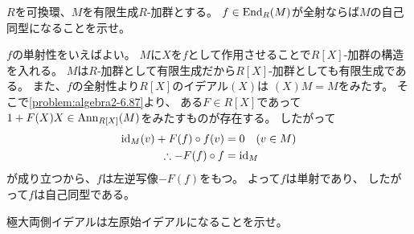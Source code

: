 \documentclass[report]{jlreq}
\begin{document}
\begin{problem}[代数学II 6.88]
    $R$を可換環、$M$を有限生成$R$-加群とする。
    $f \in \operatorname{End}_R(M)$が全射ならば$M$の自己同型になることを示せ。
\end{problem}

\begin{answer}
    $f$の単射性をいえばよい。
    $M$に$X$を$f$として作用させることで$R[X]$-加群の構造を入れる。
    $M$は$R$-加群として有限生成だから$R[X]$-加群としても有限生成である。
    また、$f$の全射性より$R[X]$のイデアル$(X)$は
    $(X)M = M$をみたす。
    そこで\cref{problem:algebra2-6.87}より、
    ある$F \in R[X]$であって$1 + F(X)X \in \operatorname{Ann}_{R[X]}(M)$をみたすものが存在する。
    したがって
    \begin{align}
        \mathrm{id}_M(v) + F(f) \circ f(v) &= 0
            \quad
            (v \in M) \\
        \therefore
            - F(f) \circ f &= \mathrm{id}_M
    \end{align}
    が成り立つから、$f$は左逆写像$-F(f)$をもつ。
    よって$f$は単射であり、
    したがって$f$は自己同型である。
\end{answer}

\begin{problem}[代数学II 6.89]
    極大両側イデアルは左原始イデアルになることを示せ。
\end{problem}

\begin{answer}
    \TODO{}
\end{answer}
\end{document}
